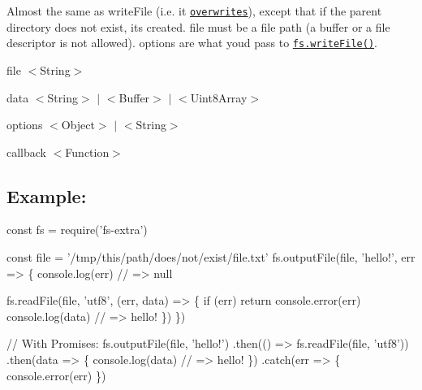 Almost the same as {\ttfamily write\+File} (i.\+e. it \href{http://pages.citebite.com/v2o5n8l2f5reb}{\tt overwrites}), except that if the parent directory does not exist, it\textquotesingle{}s created. {\ttfamily file} must be a file path (a buffer or a file descriptor is not allowed). {\ttfamily options} are what you\textquotesingle{}d pass to \href{https://nodejs.org/api/fs.html#fs_fs_writefile_file_data_options_callback}{\tt {\ttfamily fs.\+write\+File()}}.


\begin{DoxyItemize}
\item {\ttfamily file} {\ttfamily $<$String$>$}
\item {\ttfamily data} {\ttfamily $<$String$>$ $\vert$ $<$Buffer$>$ $\vert$ $<$Uint8\+Array$>$}
\item {\ttfamily options} {\ttfamily $<$Object$>$ $\vert$ $<$String$>$}
\item {\ttfamily callback} {\ttfamily $<$Function$>$}
\end{DoxyItemize}

\subsection*{Example\+:}


\begin{DoxyCode}
const fs = require('fs-extra')

const file = '/tmp/this/path/does/not/exist/file.txt'
fs.outputFile(file, 'hello!', err => \{
  console.log(err) // => null

  fs.readFile(file, 'utf8', (err, data) => \{
    if (err) return console.error(err)
    console.log(data) // => hello!
  \})
\})

// With Promises:
fs.outputFile(file, 'hello!')
.then(() => fs.readFile(file, 'utf8'))
.then(data => \{
  console.log(data) // => hello!
\})
.catch(err => \{
  console.error(err)
\})
\end{DoxyCode}
 